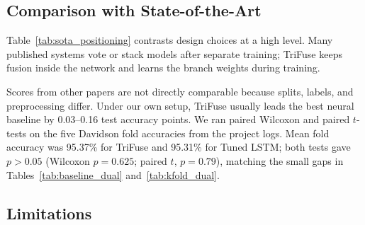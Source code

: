 \subsection{Comparison with State-of-the-Art}

Table~\ref{tab:sota_positioning} contrasts design choices at a high level. Many published systems vote or stack models after separate training; TriFuse keeps fusion inside the network and learns the branch weights during training.

\begin{table}[!t]
\caption{Qualitative Comparison of Architectural Characteristics}
\label{tab:sota_positioning}
\centering
{}
\end{table}

Scores from other papers are not directly comparable because splits, labels, and preprocessing differ. Under our own setup, TriFuse usually leads the best neural baseline by 0.03--0.16 test accuracy points. We ran paired Wilcoxon and paired $t$-tests on the five Davidson fold accuracies from the project logs. Mean fold accuracy was 95.37\% for TriFuse and 95.31\% for Tuned LSTM; both tests gave $p>0.05$ (Wilcoxon $p=0.625$; paired $t$, $p=0.79$), matching the small gaps in Tables~\ref{tab:baseline_dual} and~\ref{tab:kfold_dual}.  

\subsection{Limitations}

